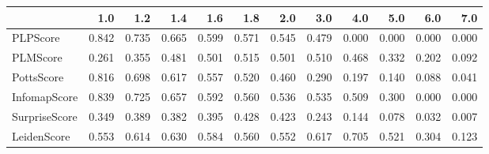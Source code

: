 \begin{tabular}{lrrrrrrrrrrr}
\toprule
{} &   1.0 &   1.2 &   1.4 &   1.6 &   1.8 &   2.0 &   3.0 &   4.0 &   5.0 &   6.0 &   7.0 \\
\midrule
PLPScore      & 0.842 & 0.735 & 0.665 & 0.599 & 0.571 & 0.545 & 0.479 & 0.000 & 0.000 & 0.000 & 0.000 \\
PLMScore      & 0.261 & 0.355 & 0.481 & 0.501 & 0.515 & 0.501 & 0.510 & 0.468 & 0.332 & 0.202 & 0.092 \\
PottsScore    & 0.816 & 0.698 & 0.617 & 0.557 & 0.520 & 0.460 & 0.290 & 0.197 & 0.140 & 0.088 & 0.041 \\
InfomapScore  & 0.839 & 0.725 & 0.657 & 0.592 & 0.560 & 0.536 & 0.535 & 0.509 & 0.300 & 0.000 & 0.000 \\
SurpriseScore & 0.349 & 0.389 & 0.382 & 0.395 & 0.428 & 0.423 & 0.243 & 0.144 & 0.078 & 0.032 & 0.007 \\
LeidenScore   & 0.553 & 0.614 & 0.630 & 0.584 & 0.560 & 0.552 & 0.617 & 0.705 & 0.521 & 0.304 & 0.123 \\
\bottomrule
\end{tabular}

